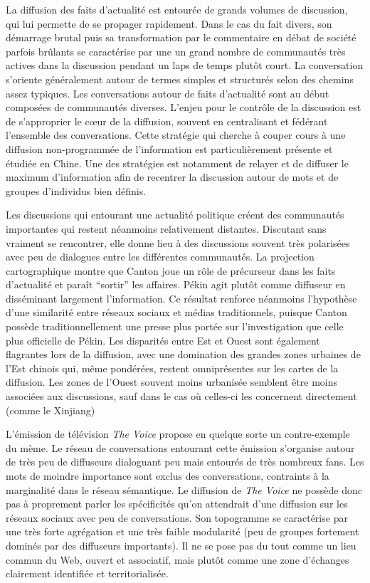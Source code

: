 La diffusion des faits d{\textquoteright}actualité est entourée de grands volumes de discussion, qui lui permette de se propager rapidement. Dans le cas du fait divers, son démarrage brutal puis sa transformation par le commentaire en débat de société parfois brûlants se caractérise par une un grand nombre de communautés très actives dans la discussion pendant un laps de temps plutôt court. La conversation s'oriente généralement autour de termes simples et structurés selon des chemins assez typiques. Les conversations autour de faits d'actualité sont au début composées de communautés diverses. L'enjeu pour le contrôle de la discussion est de s'approprier le cœur de la diffusion, souvent en centralisant et fédérant l'ensemble des conversations. Cette stratégie qui cherche à couper cours à une diffusion non-programmée de l'information est particulièrement présente et étudiée en Chine. Une des stratégies est notamment de relayer et de diffuser le maximum d'information afin de recentrer la discussion autour de mots et de groupes d{\textquoteright}individus bien définis. 

Les discussions qui entourant une actualité politique créent des communautés importantes qui restent néanmoins relativement distantes. Discutant sans vraiment se rencontrer, elle donne lieu à des discussions souvent très polarisées avec peu de dialogues entre les différentes communautés. La projection cartographique montre que Canton joue un r\^ole de précurseur dans les faits d{\textquoteright}actualité et para\^it {\textquotedblleft}sortir{\textquotedblright} les affaires. Pékin agit plutôt comme diffuseur en disséminant largement l{\textquoteright}information. Ce résultat renforce néanmoins l{\textquoteright}hypothèse d{\textquoteright}une similarité entre réseaux sociaux et médias traditionnels, puisque Canton possède traditionnellement une presse plus portée sur l'investigation que celle plus officielle de Pékin. Les disparités entre Est et Ouest sont également flagrantes lors de la diffusion, avec une domination des grandes zones urbaines de l{\textquoteright}Est chinois qui, même pondérées, restent omniprésentes sur les cartes de la diffusion. Les zones de l{\textquoteright}Ouest souvent moins urbanisée semblent être moins associées aux discussions, sauf dans le cas où celles-ci les concernent directement (comme le Xinjiang) 

L{\textquoteright}émission de télévision \textit{The Voice} propose en quelque sorte un contre-exemple du mème. Le réseau de conversations entourant cette émission s'organise autour de très peu de diffuseurs dialoguant peu mais entourés de très nombreux fans. Les mots de moindre importance sont exclus des conversations, contraints à la marginalité dans le réseau sémantique. Le diffusion de \textit{The Voice} ne possède donc pas à proprement parler les spécificités qu'on attendrait d'une diffusion sur les réseaux sociaux avec peu de conversations. Son topogramme se caractérise par une très forte agrégation et une très faible modularité (peu de groupes fortement dominés par des diffuseurs importants). Il ne se pose pas du tout comme un lieu commun du Web, ouvert et associatif,  mais plut\^ot comme une zone d'échanges clairement identifiée et territorialisée. 

